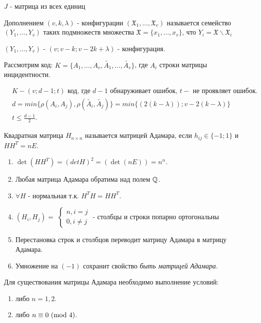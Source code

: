 \prim $J$ - матрица из всех единиц

\opr Дополнением $(v, k, \lambda)$ - конфигурации $( \mathfrak{X}_1, \dots, \mathfrak{X}_v)$
называется семейство $(Y_1, \dots, Y_v)$ таких подмножеств множества $\mathfrak{X} = \lbrace x_1, \dots, x_v\rbrace$,
что $Y_i = \mathfrak{X}\backslash\mathfrak{X}_i$

\utv
$(Y_1, \dots, Y_v)$ - $(v; v - k; v - 2k + \lambda)$ - конфигурация.

Рассмотрим код:
$K = \lbrace A_1, \dots, A_v,\tilde{A_1}, \dots, \tilde{A_v} \rbrace$, где $A_i$ строки матрицы инцидентности.

\utv
\begin{align*}
	& K - (v; d - 1; t) \text{ код, где } d - 1 \text{ обнаруживает ошибок, } t - \text{ не проявляет ошибок.}\\
	& d = min\lbrace \rho(A_i, A_j), \rho(\tilde{A_i}, \tilde{A_j})\rbrace = min\lbrace (2(k - \lambda));v - 2(k - \lambda) \rbrace\\
	& t \leq \frac{d - 1}{2}.
\end{align*}

\opr
Квадратная матрица $H_{n\times n}$ называется матрицей Адамара, если $h_{ij} \in \lbrace -1; 1 \rbrace$
и $HH^T = nE$.

\prop
\begin{enumerate}
	\item $\det(HH^T) = (detH)^2 = (\det(nE)) = n^n$.
	\item Любая матрица Адамара обратима над полем $\mathbb{Q}$.
	\item $\forall H$ - нормальная т.к. $H^TH = HH^T$.
	\item $(H_i, H_j) = $
	$\begin{cases}
		n, i = j \\
		0, i \neq j
	\end{cases}$
	- столбцы и строки попарно ортогональны
	\item Перестановка строк и столбцов переводит матрицу Адамара в матрицу Адамара.
	\item Умножение на $(-1)$ сохранит свойство \emph{быть матрицей Адамара}.
\end{enumerate}

\thr
Для существования матрицы Адамара необходимо выполнение условий:
\begin{enumerate}
	\item либо $n = 1,2$.
	\item либо $n \equiv 0\ (\mathrm{mod}\ 4)$.
\end{enumerate}

